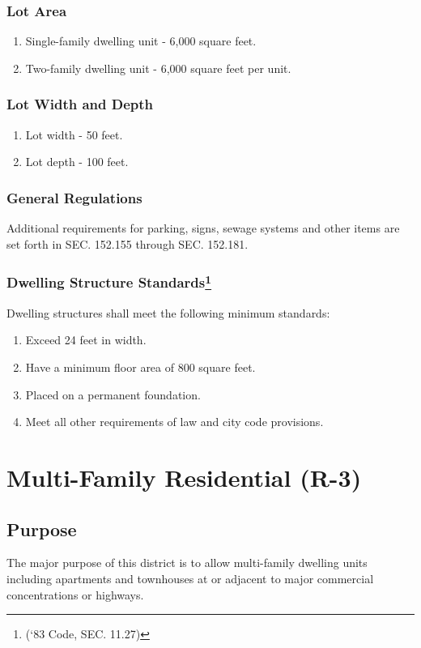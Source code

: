 \subsubsection{Lot Area}
\begin{enumerate}[{\indent}a)]
    \item Single-family dwelling unit - 6,000 square feet.
    \item Two-family dwelling unit - 6,000 square feet per unit.
\end{enumerate}
\subsubsection{Lot Width and Depth}
\begin{enumerate}[{\indent}a)]
    \item Lot width - 50 feet.
    \item Lot depth - 100 feet.
\end{enumerate}
\subsubsection{General Regulations}
Additional requirements for parking, signs, sewage systems and other items are set forth in SEC. 152.155 through SEC. 152.181.
\subsubsection{Dwelling Structure Standards\footnote{(‘83 Code, SEC. 11.27)}}
Dwelling structures shall meet the following minimum standards:
\begin{enumerate}[{\indent}a)]
    \item Exceed 24 feet in width.
    \item Have a minimum floor area of 800 square feet.
    \item Placed on a permanent foundation.
    \item Meet all other requirements of law and city code provisions.
\end{enumerate}

\section{Multi-Family Residential (R-3)}
\subsection{Purpose}
The major purpose of this district is to allow multi-family dwelling units including apartments and townhouses at or adjacent to major commercial concentrations or highways.
